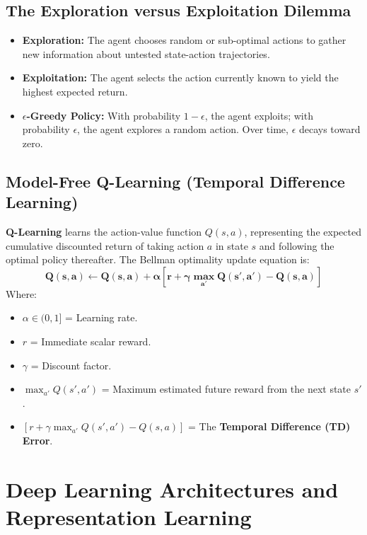 \subsection{The Exploration versus Exploitation Dilemma}
\begin{itemize}
    \item \textbf{Exploration:} The agent chooses random or sub-optimal actions to gather new information about untested state-action trajectories.
    \item \textbf{Exploitation:} The agent selects the action currently known to yield the highest expected return.
    \item \textbf{$\epsilon$-Greedy Policy:} With probability $1 - \epsilon$, the agent exploits; with probability $\epsilon$, the agent explores a random action. Over time, $\epsilon$ decays toward zero.
\end{itemize}

\subsection{Model-Free Q-Learning (Temporal Difference Learning)}
\textbf{Q-Learning} learns the action-value function $Q(s, a)$, representing the expected cumulative discounted return of taking action $a$ in state $s$ and following the optimal policy thereafter. The Bellman optimality update equation is:
\begin{equation}
\label{eq:q_learning_update}
\mathbf{Q(s, a) \leftarrow Q(s, a) + \alpha \left[ r + \gamma \max_{a'} Q(s', a') - Q(s, a) \right]}
\end{equation}
Where:
\begin{itemize}
    \item $\alpha \in (0, 1]$ = Learning rate.
    \item $r$ = Immediate scalar reward.
    \item $\gamma$ = Discount factor.
    \item $\max_{a'} Q(s', a')$ = Maximum estimated future reward from the next state $s'$.
    \item $\left[ r + \gamma \max_{a'} Q(s', a') - Q(s, a) \right]$ = The \textbf{Temporal Difference (TD) Error}.
\end{itemize}


\section{Deep Learning Architectures and Representation Learning}
\label{sec:deep_learning_architectures}


